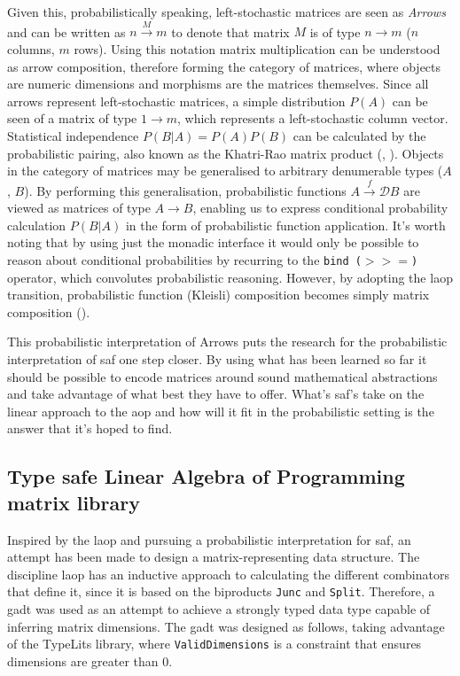 \documentclass[
  oneside,
  11pt, a4paper,
  footinclude=true,
  headinclude=true,
  cleardoublepage=empty
]{scrbook}
\theoremstyle{definition}
\theoremstyle{definition}
\begin{document}
	        Given this, probabilistically speaking, left-stochastic matrices are seen as \emph{Arrows} and can be written as $n \xrightarrow{M} m$ to denote that matrix $M$ is of type $n \longrightarrow m$ ($n$ columns, $m$ rows). Using this notation matrix multiplication can be understood as arrow composition, therefore forming the category of matrices, where objects are numeric dimensions and morphisms are the matrices themselves. Since all arrows represent left-stochastic matrices, a simple distribution $P(A)$ can be seen of a matrix of type $1 \longrightarrow m$, which represents a left-stochastic column vector. Statistical independence $P(B|A) = P(A)P(B)$ can be calculated by the probabilistic pairing, also known as the Khatri-Rao matrix product (\cite{Macedo2012MatricesAA}, \cite{murta2013calculating}). Objects in the category of matrices may be generalised to arbitrary denumerable types ($A$, $B$). By performing this generalisation, probabilistic functions $A \xrightarrow{f} \mathscr{D}B$ are viewed as matrices of type $A \longrightarrow B$, enabling us to express conditional probability calculation $P(B|A)$ in the form of probabilistic function application. It's worth noting that by using just the monadic interface it would only be possible to reason about conditional probabilities by recurring to the \texttt{bind ($>>=$)} operator, which convolutes probabilistic reasoning. However, by adopting the \gls{laop} transition, probabilistic function (Kleisli) composition becomes simply matrix composition (\cite{oliveira2012towards}).
	        
	        This probabilistic interpretation of Arrows puts the research for the probabilistic interpretation of \gls{saf} one step closer. By using what has been learned so far it should be possible to encode matrices around sound mathematical abstractions and take advantage of what best they have to offer. What's \gls{saf}'s take on the linear approach to the \gls{aop} and how will it fit in the probabilistic setting is the answer that it's hoped to find.
	    
	    \subsection{Type safe Linear Algebra of Programming matrix library}\label{sec-laop-lib1}
	    
	    Inspired by the \gls{laop} and pursuing a probabilistic interpretation for \gls{saf}, an attempt has been made to design a matrix-representing data structure. The discipline \gls{laop} has an inductive approach to calculating the different combinators that define it, since it is based on the biproducts \texttt{Junc} and \texttt{Split}. Therefore, a \gls{gadt} was used as an attempt to achieve a strongly typed data type capable of inferring matrix dimensions. The \gls{gadt} was designed as follows, taking advantage of the TypeLits library, where \texttt{ValidDimensions} is a constraint that ensures dimensions are greater than 0.
	    
\end{document}
